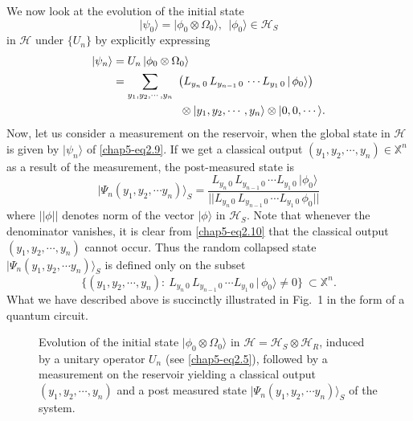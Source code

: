 We now look at the evolution of the initial state 
\begin{equation}
\vert\psi_0\rangle=\vert \phi_0\otimes \Omega_0\rangle,\ \  \vert\phi_0\rangle\in \mathcal{H}_S  \label{chap5-eq2.8}
\end{equation}  
in $\mathcal{H}$ under $\{U_n\}$ by explicitly expressing
\begin{align} 
\vert\psi_n\rangle &= U_n\, \vert \phi_0\otimes \Omega_0\rangle \nonumber \\ 
&= \sum_{y_1,y_2,\cdots , y_n}\ \left( L_{y_n\, 0}\, L_{y_{n-1}\, 0}\, \cdots L_{y_1\, 0}\, \vert\,\phi_0\rangle\right)\notag \\
& \qquad \qquad \qquad \otimes \vert y_1, y_2,\cdots ,y_n\rangle \otimes \vert 0, 0, \cdots \rangle. \label{chap5-eq2.9}
\end{align} 
Now, let us consider a measurement on the reservoir, when the global state in $\mathcal{H}$ is  
given by $\vert\psi_n\rangle$ of \ref{chap5-eq2.9}. If we get a classical output $(y_1,y_2,\cdots, y_n)\in \mathbb{X}^n$ as a result of the measurement, the post-measured  state is  
\begin{equation} 
\vert \Psi_n(y_1,y_2,\cdots y_n)\rangle_S=\frac{\, L_{y_n\, 0}\, L_{y_{n-1}\, 0}\, \cdots L_{y_1\, 0}\, \vert\phi_0\rangle }
{\vert\vert L_{y_n\, 0}\, L_{y_{n-1}\, 0}\, \cdots L_{y_1\, 0}\, \phi_0\vert\vert}  \label{chap5-eq2.10}
\end{equation}
where $\vert\vert \phi \vert\vert$ denotes norm of the vector $\vert\phi\rangle$ in $\mathcal{H}_S$. Note that whenever the denominator vanishes, it is clear from \ref{chap5-eq2.10} that the classical output $(y_1,y_2,\cdots, y_n)$ cannot occur. Thus the random collapsed state $\vert \Psi_n(y_1,y_2,\cdots y_n)\rangle_S$ is defined only on the subset 
$$
\{(y_1,y_2,\cdots , y_n):\    L_{y_n\, 0}\, L_{y_{n-1}\, 0}\, \cdots L_{y_1\, 0}\, \vert\,\phi_0\rangle\neq 0\}\  \subset \mathbb{X}^n.
$$ 
What we have described above is succinctly illustrated  in Fig.~1 in the form of a quantum circuit. 
\begin{figure}[H]
	\caption{Evolution of the initial state $\vert\phi_0\otimes \Omega_0\rangle$  in $\mathcal{H}=\mathcal{H}_S\otimes \mathcal{H}_R$, induced by a unitary operator $U_n$ (see \eqref{chap5-eq2.5}), followed by a measurement on the reservoir yielding a classical output $(y_1,y_2,\cdots, y_n)$ and a post measured state $\vert \Psi_n(y_1,y_2,\cdots y_n)\rangle_S$ of the system.} 
\end{figure}

